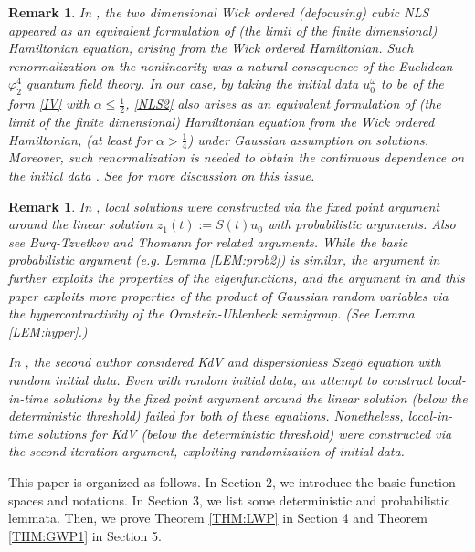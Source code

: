 \documentclass[11pt]{amsart}
\newtheorem{remark}[theorem]{Remark}
\numberwithin{equation}{section} \numberwithin{theorem}{section}
\begin{document}
\begin{remark}
	\label{REM:renorm}\rm In \cite{Bourgain:1996p446}, the two dimensional Wick ordered (defocusing) cubic NLS appeared as an equivalent formulation of (the limit of the finite dimensional) Hamiltonian equation, arising from the Wick ordered Hamiltonian. Such renormalization on the nonlinearity was a natural consequence of the Euclidean $\varphi_2^4$ quantum field theory. In our case, by taking the initial data $u_0^\omega$ to be of the form \eqref{IV} with ${\alpha} \leq \frac{1}{2}$, \eqref{NLS2} also arises as an equivalent formulation of (the limit of the finite dimensional) Hamiltonian equation from the Wick ordered Hamiltonian, (at least for ${\alpha} > \frac{1}{4}$) under Gaussian assumption on solutions. Moreover, such renormalization is needed to obtain the continuous dependence on the initial data \cite{Christ:2007p1011, Grunrock:2008p659}.
See \cite{SULEM} for more discussion on this issue.
\end{remark}

\begin{remark}
	\rm In \cite{Bourgain:1996p446}, local solutions were constructed via the fixed point argument around the linear solution $z_1(t) := S(t)u_0$ with probabilistic arguments. Also see Burq-Tzvetkov \cite{Burq:2008p624, Burq:2008p623} and Thomann \cite{Thomann:2009p1427} for related arguments. While the basic probabilistic argument (e.g. Lemma \ref{LEM:prob2}) is similar, the argument in \cite{Burq:2008p624, Thomann:2009p1427} further exploits the properties of the eigenfunctions, and the argument in \cite{Bourgain:1996p446} and this paper exploits more properties of the product of Gaussian random variables via the hypercontractivity of the Ornstein-Uhlenbeck semigroup. 
(See Lemma \ref{LEM:hyper}.)

In \cite{OhFE}, the second author considered KdV and dispersionless Szeg\"o equation
with random initial data.
Even with random initial data, 
an attempt to construct local-in-time solutions by the fixed point argument
around the linear solution (below the deterministic threshold) failed for both of these equations. 
Nonetheless, local-in-time solutions for KdV 
(below the deterministic threshold) were constructed
via the second iteration argument, exploiting randomization of initial data.
\end{remark}

\medskip

This paper is organized as follows. 
In Section 2, we introduce the basic function spaces and notations. 
In Section 3, we list some deterministic and probabilistic lemmata. 
Then, we prove Theorem \ref{THM:LWP} in Section 4
and Theorem \ref{THM:GWP1} in Section 5.
\end{document}
